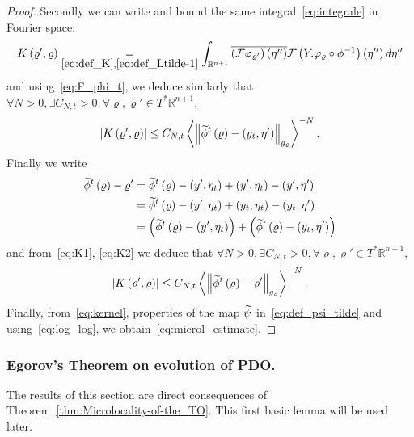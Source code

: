 \documentclass[AHL,Unicode,longabstracts,published]{cedram}
\newcommand{\clF}{\mathcal{F}}
\newcommand{\bbR}{\mathbb{R}}
\let\oldtilde\tilde
\renewcommand*{\tilde}[1]{\mathchoice{\widetilde{#1}}{\widetilde{#1}}{\oldtilde{#1}}{\oldtilde{#1}}}
\let\oldexists\exists
\renewcommand*{\exists}{\mathrel{\oldexists}}
\let\oldforall\forall
\renewcommand*{\forall}{\mathrel{\oldforall}}
\newcommand{\bbR}{\mathbb{R}}
\begin{document}
\begin{proof}
Secondly we can write and bound the same integral~\eqref{eq:integrale} in Fourier space:
\[
K\left(\varrho',\varrho\right)\underset{\eqref{eq:def_K},\eqref{eq:def_Ltilde-1}}{=}\int_{\bbR^{n+1}}\overline{\left(\clF\varphi_{\varrho'}\right)\left(\eta''\right)}\clF\left(Y.\varphi_{\varrho}\circ\phi^{-1}\right)\left(\eta''\right)d\eta''
\]
and using~\eqref{eq:F_phi_t}, we deduce similarly that $\forall N>0,\exists C_{N,t}>0,\forall\varrho,\varrho'\in T^{*}\bbR^{n+1}$,
\begin{equation}
\left|K\left(\varrho',\varrho\right)\right|\leq C_{N,t}\left\langle \left\Vert \tilde{\phi}^{t}\left(\varrho\right)-\left(y_{t},\eta'\right)\right\Vert _{g_{\varrho}}\right\rangle ^{-N}.\label{eq:K2}
\end{equation}
Finally we write
\begin{align*}
\tilde{\phi}^{t}\left(\varrho\right)-\varrho' & =\tilde{\phi}^{t}\left(\varrho\right)-\left(y',\eta_{t}\right)+\left(y',\eta_{t}\right)-\left(y',\eta'\right)\\
& =\tilde{\phi}^{t}\left(\varrho\right)-\left(y',\eta_{t}\right)+\left(y_{t},\eta_{t}\right)-\left(y_{t},\eta'\right)\\
& =\left(\tilde{\phi}^{t}\left(\varrho\right)-\left(y',\eta_{t}\right)\right)+\left(\tilde{\phi}^{t}\left(\varrho\right)-\left(y_{t},\eta'\right)\right)
\end{align*}
and from~\eqref{eq:K1}, \eqref{eq:K2} we deduce that $\forall N>0,\exists C_{N,t}>0,\forall\varrho,\varrho'\in T^{*}\bbR^{n+1}$,
\[
\left|K\left(\varrho',\varrho\right)\right|\leq C_{N,t}\left\langle \left\Vert \tilde{\phi}^{t}\left(\varrho\right)-\varrho'\right\Vert _{g_{\varrho}}\right\rangle ^{-N}.
\]
Finally, from~\eqref{eq:kernel}, properties of the map $\tilde{\psi}$ in~\eqref{eq:def_psi_tilde} and using~\eqref{eq:log_log}, we obtain~\eqref{eq:microl_estimate}.
\end{proof}

\subsubsection{Egorov's Theorem on evolution of PDO.}

The results of this section are direct consequences of Theorem~\ref{thm:Microlocality-of-the_TO}. This first basic lemma will be used later.
\end{document}
